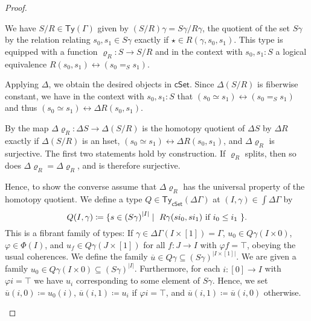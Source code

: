 \documentclass[10pt,a4paper]{article}
\theoremstyle{definition}
\theoremstyle{remark}
\newcommand{\cSet}{\mathsf{cSet}}
\newcommand\Ty{\mathsf{Ty}}
\DeclarePairedDelimiter\set{\{}{\}}
\begin{document}
\begin{proof}
  \begin{description}[font=\normalfont,leftmargin=0cm]
  \item[\ref{prop:set-quotient-is-homotopy-quotient-iff-surjection-splits:well-defined}] 
    We have \(S/R \in \Ty(\Gamma)\) given by \((S/R)\gamma = S\gamma / R\gamma\), the quotient of the set \(S\gamma\) by the relation relating \(s_0, s_1 \in S\gamma\) exactly if \(\star \in R(\gamma, s_0, s_1)\).
    This type is equipped with a function \(\varrho_R \colon S \to S/R\) and in the context with \(s_0, s_1 \colon S\) a logical equivalence \(R(s_0, s_1) \leftrightarrow (s_0 =_S s_1)\).

    Applying \(\Delta\), we obtain the desired objects in \(\cSet\).
    Since \(\Delta(S/R)\) is fiberwise constant, we have in the context with \(s_0, s_1 \colon S\) that \((s_0 \simeq s_1) \leftrightarrow (s_0 =_S s_1)\) and thus \((s_0 \simeq s_1) \leftrightarrow \Delta R(s_0, s_1)\).
  \item[\ref{prop:set-quotient-is-homotopy-quotient-iff-surjection-splits:characterization}] %
    By \cite[Theorem 18.2.3]{rijke2025intro} the map \(\Delta \varrho_{R} \colon \Delta S \to \Delta(S/R)\) is the homotopy quotient of \(\Delta S\) by \(\Delta R\) exactly if \(\Delta(S/R)\) is an hset, \((s_0 \simeq s_1) \leftrightarrow \Delta R(s_0, s_1)\), and \(\Delta \varrho_{R}\) is surjective.
    The first two statements hold by construction.
    If \(\varrho_R\) splits, then so does \(\Delta \varrho_{R} = \Delta \varrho_{R}\), and is therefore surjective.

    Hence, to show the converse assume that \(\Delta \varrho_{R}\) has the universal property of the homotopy quotient.
    We define a type \(Q \in \Ty_{\cSet}(\Delta\Gamma)\) at \((I, \gamma) \in \int\Delta\Gamma\) by
    \[
      Q(I, \gamma) \coloneqq \set{ s \in {(S\gamma)}^{|I|} \mid \text{ \(R\gamma(si_0, si_1)\) if \(i_0 \leq i_1\) } }.
    \]
    This is a fibrant family of types: If \(\gamma \in \Delta\Gamma(I \times [1]) = \Gamma\), \(u_0 \in Q\gamma(I \times 0)\), \(\varphi \in \Phi(I)\), and \(u_f \in Q\gamma(J \times [1])\) for all \(f \colon J \to I\) with \(\varphi f = \top\), obeying the usual coherences.
    We define the family \(\overline u \in Q\gamma \subseteq {(S\gamma)}^{|I \times [1]|}\).
    We are given a family \(u_0 \in Q\gamma(I \times 0) \subseteq {(S\gamma)}^{|I|}\).
    Furthermore, for each \(i \colon [0] \to I\) with \(\varphi i = \top\) we have \(u_i\) corresponding to some element of \(S\gamma\).
    Hence, we set \(\overline u(i, 0) \coloneqq u_0(i)\), \(\overline u(i, 1) \coloneqq u_i\) if \(\varphi i = \top\), and \(\overline u(i, 1) \coloneqq \overline u(i, 0)\) otherwise.


\end{description}
\end{proof}
\end{document}
